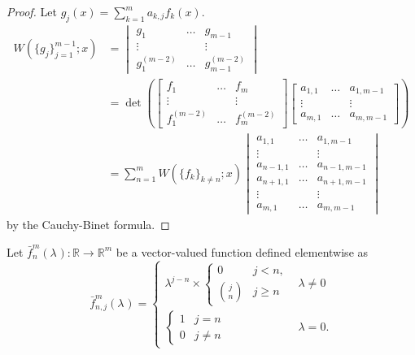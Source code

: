 \documentclass{book}
\begin{document}
\begin{proof}
Let $g_j(x) = \sum_{k=1}^m a_{k,j} f_k(x)$.
\begin{align*}
W(\{g_j\}_{j=1}^{m-1} ; x) & = \begin{vmatrix}
g_1 & \dots & g_{m-1} \\
\vdots & & \vdots \\
g_1^{(m-2)} & \dots & g_{m-1}^{(m-2)} \end{vmatrix} \\
& = \det \left ( \begin{bmatrix} f_1 & \dots & f_m \\ \vdots & & \vdots \\ f_1^{(m-2)} & \dots & f_m^{(m-2)} \end{bmatrix} \begin{bmatrix} a_{1,1} & \dots & a_{1,m-1} \\ \vdots & & \vdots \\ a_{m,1} & \dots & a_{m,m-1} \end{bmatrix} \right ) \\
& = \sum_{n=1}^{m} W(\{f_k\}_{k\neq n} ; x) \begin{vmatrix}
a_{1,1} & \dots & a_{1,m-1} \\
\vdots & & \vdots \\
a_{n-1,1} & \dots & a_{n-1,m-1} \\
a_{n+1,1} & \dots & a_{n+1,m-1} \\
\vdots & & \vdots \\
a_{m,1} & \dots & a_{m,m-1}
\end{vmatrix}
\end{align*}
by the Cauchy-Binet formula.
\end{proof}

\newcommand{\fmn}[3]{\bar{f}^{#2}_{#1}(\lambda_{#3})}

\begin{defn}
Let $\fmn{n}{m}{}:\mathbb{R} \rightarrow \mathbb{R}^m$ be a vector-valued function defined elementwise as
\begin{equation*}
\fmn{n,j}{m}{} = \begin{cases} \lambda^{j-n} \times \begin{cases} 0 & j< n, \\ \binom{j}{n} & j \geq n \end{cases} & \lambda \neq 0 \\
\begin{cases} 1 & j = n \\ 0 & j \neq n \end{cases} & \lambda = 0. \end{cases}
\end{equation*}
\end{defn}
\end{document}
